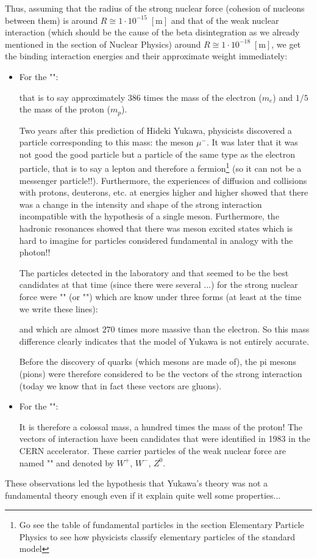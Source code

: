 	Thus, assuming that the radius of the strong nuclear force (cohesion of nucleons between them) is around $R\cong 1\cdot 10^{-15}\;[\text{m}]$ and that of the weak nuclear interaction (which should be the cause of the beta disintegration as we already mentioned in the section of Nuclear Physics) around $R\cong 1\cdot 10^{-18}\;[\text{m}]$, we get the binding interaction energies and their approximate weight immediately:
	\begin{itemize}
		\item For the "":
		
		that is to say approximately $386$ times the mass of the electron ($m_e$) and $1/5$ the mass of the proton ($m_p$).
	
		Two years after this prediction of Hideki Yukawa, physicists discovered a particle corresponding to this mass: the meson $\mu^{-}$. It was later that it was not good the good particle but a particle of the same type as the electron particle, that is to say a lepton and therefore a fermion\footnote{Go see the table of fundamental particles in the section Elementary Particle Physics to see how physicists classify elementary particles of the standard model} (so it can not be a messenger particle!!). Furthermore, the experiences of diffusion and collisions with protons, deuterons, etc. at energies higher and higher showed that there was a change in the intensity and shape of the strong interaction incompatible with the hypothesis of a single meson. Furthermore, the hadronic resonances showed that there was meson excited states which is hard to imagine for particles considered fundamental in analogy with the photon!!
	
		The particles detected in the laboratory and that seemed to be the best candidates at that time (since there were several ...) for the strong nuclear force were "" (or "") which are know under three forms (at least at the time we write these lines):
		
		
		and which are almost $270$ times more massive than the electron. So this mass difference clearly indicates that the model of Yukawa is not entirely accurate.

		Before the discovery of quarks (which mesons are made of), the pi mesons (pions) were therefore considered to be the vectors of the strong interaction (today we know that in fact these vectors are gluons).
	
		\item For the "":
		
		It is therefore a colossal mass, a hundred times the mass of the proton! The vectors of interaction have been candidates that were identified in 1983 in the CERN accelerator. These carrier particles of the weak nuclear force are named "" and denoted by $W^+$, $W^-$, $Z^0$.
	\end{itemize}
	These observations led the hypothesis that Yukawa's theory was not a fundamental theory enough even if it explain quite well some properties...

